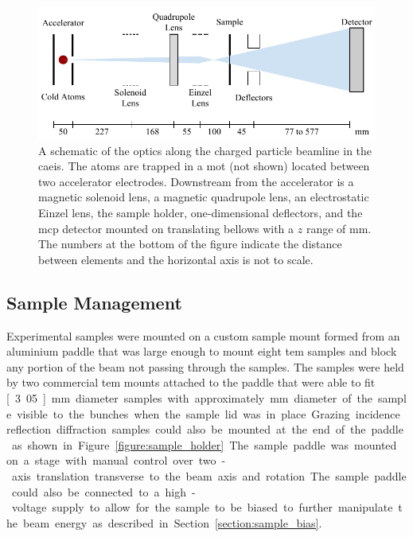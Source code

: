 \begin{figure}
    \center
    \includegraphics{part2/Figs/FullApparatusSchematic.pdf}
    \caption[Beam optics schematic.]{A schematic of the optics along the charged particle beamline in the \gls{caeis}. The atoms are trapped in a \gls{mot} (not shown) located between two accelerator electrodes. Downstream from the accelerator is a magnetic solenoid lens, a magnetic quadrupole lens, an electrostatic Einzel lens, the sample holder, one-dimensional deflectors, and the \gls{mcp} detector mounted on translating bellows with a $z$ range of \unit[500]{mm}. The numbers at the bottom of the figure indicate the distance between elements and the horizontal axis is not to scale.}
    \label{figure:full_beam_apparatus}
\end{figure}

\subsection{Sample Management}

Experimental samples were mounted on a custom sample mount formed from an aluminium paddle that was large enough to mount eight \gls{tem} samples and block any portion of the beam not passing through the samples.
The samples were held by two commercial \gls{tem} mounts attached to the paddle that were able to fit \unit[3.05]{mm} diameter samples with approximately \unit[2]{mm} diameter of the sample visible to the bunches when the sample lid was in place.
Grazing incidence reflection diffraction samples could also be mounted at the end of the paddle as shown in Figure~\ref{figure:sample_holder}.
The sample paddle was mounted on a stage with manual control over two-axis translation transverse to the beam axis and rotation.
The sample paddle could also be connected to a high-voltage supply to allow for the sample to be biased to further manipulate the beam energy as described in Section~\ref{section:sample_bias}.

